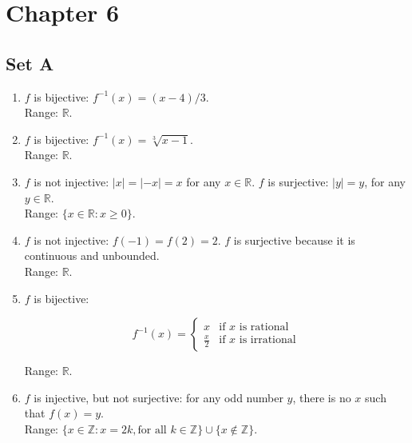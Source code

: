 \section{Chapter 6}
\subsection{Set A}

\begin{enumerate}
    \item $f$ is bijective: $f^{-1}(x) = (x - 4)/3$.\\ Range: $\mathbb{R}$.

    \item $f$ is bijective: $f^{-1}(x) = \sqrt[3]{x - 1}$.\\ Range: $\mathbb{R}$.

    \item $f$ is not injective: $|x| = |-x| = x$ for any $x \in \mathbb{R}$. $f$ is surjective: $|y| = y$, for any $y \in \mathbb{R}$.\\ Range: $\{x \in \mathbb{R}: x \geqslant 0\}$.

    \item $f$ is not injective: $f(-1) = f(2) = 2$. $f$ is surjective because it is continuous and unbounded.\\ Range: $\mathbb{R}$.

    \item $f$ is bijective: 
        
       \[
        f^{-1}(x) = 
            \begin{cases}
                x & \text{if $x$ is rational} \\
                \frac{x}{2} & \text{if $x$ is irrational}
            \end{cases}
        \]

      Range: $\mathbb{R}$.

    \item $f$ is injective, but not surjective: for any odd number $y$, there is no $x$ such that $f(x) = y$.\\ Range: $\{x \in \mathbb{Z}: x = 2k, \text{for all $k \in \mathbb{Z}$}\} \cup \{x \notin \mathbb{Z}\}$.
\end{enumerate}


